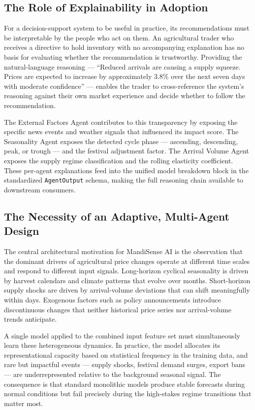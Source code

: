 \documentclass[12pt,a4paper]{report}
\begin{document}
\subsection{The Role of Explainability in Adoption}

For a decision-support system to be useful in practice, its recommendations must be interpretable by the people who act on them. An agricultural trader who receives a directive to hold inventory with no accompanying explanation has no basis for evaluating whether the recommendation is trustworthy. Providing the natural-language reasoning — ``Reduced arrivals are causing a supply squeeze. Prices are expected to increase by approximately 3.8\% over the next seven days with moderate confidence'' — enables the trader to cross-reference the system's reasoning against their own market experience and decide whether to follow the recommendation.

The External Factors Agent contributes to this transparency by exposing the specific news events and weather signals that influenced its impact score. The Seasonality Agent exposes the detected cycle phase — ascending, descending, peak, or trough — and the festival adjustment factor. The Arrival Volume Agent exposes the supply regime classification and the rolling elasticity coefficient. These per-agent explanations feed into the unified model breakdown block in the standardized \texttt{AgentOutput} schema, making the full reasoning chain available to downstream consumers.

\subsection{The Necessity of an Adaptive, Multi-Agent Design}

The central architectural motivation for MandiSense AI is the observation that the dominant drivers of agricultural price changes operate at different time scales and respond to different input signals. Long-horizon cyclical seasonality is driven by harvest calendars and climate patterns that evolve over months. Short-horizon supply shocks are driven by arrival-volume deviations that can shift meaningfully within days. Exogenous factors such as policy announcements introduce discontinuous changes that neither historical price series nor arrival-volume trends anticipate.

A single model applied to the combined input feature set must simultaneously learn these heterogeneous dynamics. In practice, the model allocates its representational capacity based on statistical frequency in the training data, and rare but impactful events — supply shocks, festival demand surges, export bans — are underrepresented relative to the background seasonal signal. The consequence is that standard monolithic models produce stable forecasts during normal conditions but fail precisely during the high-stakes regime transitions that matter most.
\end{document}
